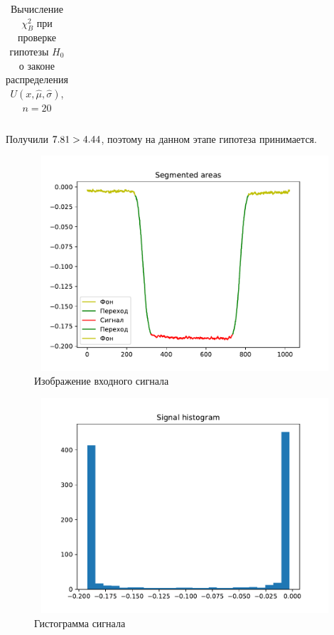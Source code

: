 \documentclass[a4paper]{article}
\begin{document}
\begin{table}[H]
	\centering
	\begin{tabular}{| c | c | c | c | c | c | c |}
		\hline
		
	\end{tabular}
	\caption{ Вычисление $\chi^{2}_{B}$ при проверке гипотезы $H_{0}$ о законе распределения $U(x,\hat{\mu}, \hat{\sigma})$, $n=20$}
	\label{tab:uniform_chi}
\end{table}

\noindent Получили $7.81 > 4.44$, поэтому на данном этапе гипотеза принимается.

    
	\begin{figure}[H]
		\centering
		\includegraphics[width = 13cm, height = 8cm]{src_lab_8/Segmented500}
		\caption{Изображение входного сигнала}
		\label{fig:signal}
	\end{figure}

		\begin{figure}[H]
		\centering
		\includegraphics[width = 13cm, height = 8cm]{src_lab_8/Signal500Hist}
		\caption{Гистограмма сигнала}
		\label{fig:signalHist}
	\end{figure}
\end{document}
